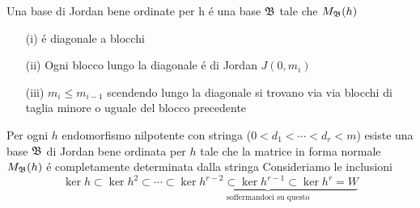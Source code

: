 \begin{defn} \bianco
Una base di Jordan bene ordinate per h \'e una base $\mathfrak{B}$ tale che $M_{\mathfrak{B}}(h)$ 
\begin{itemize}
\item[(i)]\'e diagonale a blocchi
\item[(ii)] Ogni blocco lungo la diagonale \'e di Jordan $J(0,m_i) $
\item[(iii)] $m_i \leq m_{i-1} $ scendendo lungo la diagonale si trovano via via blocchi di taglia minore o uguale del blocco precedente
\end{itemize}
\end{defn}
\spazio
\begin{thm}\bianco
Per ogni $h$ endomorfismo nilpotente con stringa ($0<d_1< \cdots< d_r<m$) esiste una base $\mathfrak{B}$ di Jordan bene ordinata per $h$ tale che la matrice in forma normale $M_{\mathfrak{B}}(h)$ \'e completamente determinata dalla stringa
\proof
Consideriamo le inclusioni
$$\ker h \subset \ker h^2 \subset \cdots \subset \underbrace{ \ker h^{r-2}  \subset  \ker h^{r-1} \subset \ker h^r=W}_{\text{ soffermandoci su questo }} $$


\end{thm}
